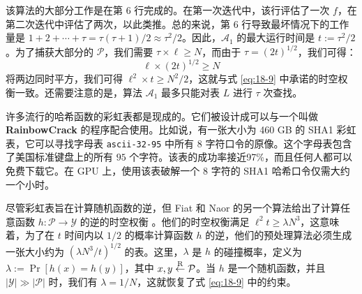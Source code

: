 \begin{snote}[彩虹表。]
\vspace*{10pt}

\noindent
该算法的大部分工作是在第 $6$ 行完成的。在第一次迭代中，该行评估了一次 $f$，在第二次迭代中评估了两次，以此类推。总的来说，第 $6$ 行导致最坏情况下的工作量是 $1+2+\cdots+\tau=\tau(\tau+1)/2\approx\tau^2/2$。因此，$\mathcal{A}_1$ 的最大运行时间是 $t:=\tau^2/2$。为了捕获大部分的 $\mathcal{P}$，我们需要 $\tau\times\ell\geq N$，而由于 $\tau=(2t)^{1/2}$，我们可得：
\[
\ell\times(2t)^{1/2}\geq N
\]
将两边同时平方，我们可得 $\ell^2\times t\geq N^2/2$，这就与式 \ref{eq:18-9} 中承诺的时空权衡一致。还需要注意的是，算法 $\mathcal{A}_1$ 最多只能对表 $L$ 进行 $\tau$ 次查找。
\end{snote}

\begin{snote}[实践中的彩虹表。]
许多流行的哈希函数的彩虹表都是现成的。它们被设计成可以与一个叫做 \textbf{RainbowCrack} 的程序配合使用。比如说，有一张大小为 460 GB 的 SHA1 彩虹表，它可以寻找字母表 \texttt{ascii-32-95} 中所有 $8$ 字符口令的原像。这个字母表包含了美国标准键盘上的所有 $95$ 个字符。该表的成功率接近97\%，而且任何人都可以免费下载它。在 GPU 上，使用该表破解一个 $8$ 字符的 SHA1 哈希口令仅需大约一个小时。
\end{snote}

\begin{snote}[扩展。]
尽管彩虹表旨在计算随机函数的逆，但 Fiat 和 Naor 的另一个算法给出了计算任意函数 $h:\mathcal{P}\to\mathcal{Y}$ 的逆的时空权衡 \cite{fiat1991rigorous}。他们的时空权衡满足 $\ell^2t\geq\lambda N^3$，这意味着，为了在 $t$ 时间内以 $1/2$ 的概率计算函数 $h$ 的逆，他们的预处理算法必须生成一张大小约为 $(\lambda N^3/t)^{1/2}$ 的表。这里，$\lambda$ 是 $h$ 的碰撞概率，定义为 $\lambda:=\Pr[h(x)=h(y)]$，其中 $x,y\overset{\rm R}\leftarrow\mathcal{P}$。当 $h$ 是一个随机函数，并且 $|\mathcal{Y}|\gg|\mathcal{P}|$ 时，我们有 $\lambda=1/N$，这就恢复了式 \ref{eq:18-9} 中的约束。
\end{snote}